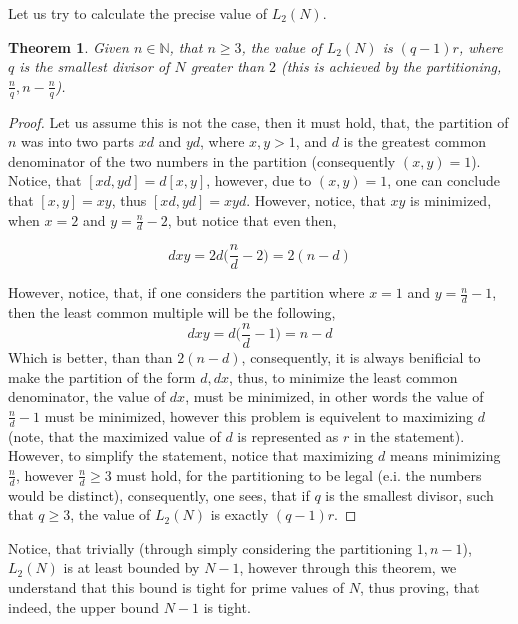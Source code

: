 \documentclass{article}
\newtheorem{theorem}{Theorem}
\begin{document}
Let us try to calculate the precise value of \(L_2(N)\).

\begin{theorem}
	Given \(n \in \mathbb{N}\), that \(n \geq 3\), the value of \(L_2(N)\) is \((q - 1)r\), where \(q\) is the smallest divisor of \(N\) greater than \(2\) (this is achieved by the partitioning, \(\frac{n}{q}, n - \frac{n}{q}\)).
\end{theorem}

\begin{proof}
	Let us assume this is not the case, then it must hold, that, the partition of \(n\) was into two parts \(xd\) and \(yd\), where \(x, y > 1\), and \(d\) is the greatest common denominator of the two numbers in the partition (consequently \((x, y) = 1\)). Notice, that \([xd, yd] = d[x, y]\), however, due to \((x, y) = 1\), one can conclude that \([x, y] = xy\), thus \([xd, yd] = xyd\). However, notice, that \(xy\) is minimized, when \(x = 2\) and \(y = \frac{n}{d} - 2\), but notice that even then,

\begin{equation}
	dxy = 2d \biggl( \frac{n}{d} - 2 \biggr) = 2(n - d)
\end{equation}

However, notice, that, if one considers the partition where \(x = 1\) and \(y = \frac{n}{d} - 1\), then the least common multiple will be the following,
\begin{equation}
	dxy = d \biggl( \frac{n}{d} - 1 \biggr) = n - d
\end{equation}
Which is better, than than \(2(n - d)\), consequently, it is always benificial to make the partition of the form \(d, dx\), thus, to minimize the least common denominator, the value of \(dx\), must be minimized, in other words the value of \(\frac{n}{d} - 1\) must be minimized, however this problem is equivelent to maximizing \(d\) (note, that the maximized value of \(d\) is represented as \(r\) in the statement). However, to simplify the statement, notice that maximizing \(d\) means minimizing \(\frac{n}{d}\), however \(\frac{n}{d} \geq 3\) must hold, for the partitioning to be legal (e.i. the numbers would be distinct), consequently, one sees, that if \(q\) is the smallest divisor, such that \(q \geq 3\), the value of \(L_2(N)\) is exactly \((q - 1)r\).
\end{proof}

Notice, that trivially (through simply considering the partitioning \(1, n - 1\)), \(L_2(N)\) is at least bounded by \(N - 1\), however through this theorem, we understand that this bound is tight for prime values of \(N\), thus proving, that indeed, the upper bound \(N - 1\) is tight.
\end{document}
